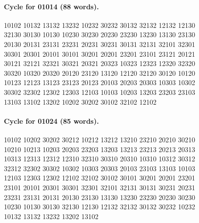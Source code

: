 \documentclass[11pt]{article}
\theoremstyle{remark}
\numberwithin{equation}{section}
\numberwithin{table}{section}
\begin{document}
\paragraph{Cycle for 01014 (88 words).}
\begingroup\footnotesize\ttfamily\begin{flushleft}
10102 10132 13132 13232 10232 30232 30132 32132 12132 12130\\
32130 30130 10130 10230 30230 20230 23230 13230 13130 23130\\
20130 20131 23131 23231 20231 30231 30131 32131 32101 32301\\
30301 20301 20101 30101 30201 20201 23201 23101 23121 20121\\
30121 32121 32321 30321 20321 20323 10323 12323 12320 32320\\
30320 10320 20320 20120 23120 13120 12120 32120 30120 10120\\
10123 12123 13123 23123 20123 20103 20203 20303 10303 10302\\
30302 32302 12302 12303 12103 10103 10203 13203 23203 23103\\
13103 13102 13202 10202 30202 30102 32102 12102\\
\end{flushleft}\endgroup
\paragraph{Cycle for 01024 (85 words).}
\begingroup\footnotesize\ttfamily\begin{flushleft}
10102 10202 30202 30212 10212 13212 13210 23210 20210 30210\\
10210 10213 10203 20203 23203 13203 13213 23213 20213 20313\\
10313 12313 12312 12310 32310 30310 20310 10310 10312 30312\\
32312 32302 30302 10302 10303 20303 20103 23103 13103 10103\\
12103 12303 12302 12102 32102 30102 30101 30201 20201 23201\\
23101 20101 20301 30301 32301 32101 32131 30131 30231 20231\\
23231 23131 20131 20130 23130 13130 13230 23230 20230 30230\\
10230 10130 30130 32130 12130 12132 32132 30132 30232 10232\\
10132 13132 13232 13202 13102\\
\end{flushleft}\endgroup
\end{document}
